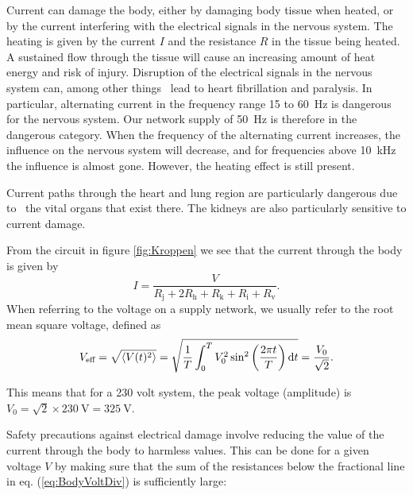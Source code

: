 \documentclass[../Elmag-labhefte-2022.tex]{subfiles}
\begin{document}
Current can damage the body, either by damaging body tissue when heated, or by the current interfering with the electrical signals in the nervous system. The heating is given by the current $I$ and the resistance $R$ in the tissue being heated. A sustained flow through the tissue will cause an increasing amount of heat energy and risk of injury. Disruption of the electrical signals in the nervous system can, among other things \, lead to heart fibrillation and paralysis. In particular, alternating current in the frequency range \num{15} to \SI{60}{\hertz} is dangerous for the nervous system. Our network supply of \SI{50}{\hertz} is therefore in the dangerous category. When the frequency of the alternating current increases, the influence on the nervous system will decrease, and for frequencies above \SI{10}{\kilo\hertz} the influence is almost gone. However, the heating effect is still present.

Current paths through the heart and lung region are particularly dangerous due to \ the vital organs that exist there. The kidneys are also particularly sensitive to current damage.

From the circuit in figure \ref{fig:Kroppen} we see that the current through the body is given by
\begin{equation}
  I = \frac{V}{R_\text{j} + 2R_\text{h} + R_\text{k} + R_\text{i} + R_\text{v}}.
  \label{eq:BodyVoltDiv}
\end{equation}
When referring to the voltage on a supply network, we usually refer to the root mean square voltage, defined as
\begin{equation}
    V_\text{eff}
        = \sqrt{\langle V(t)^2 \rangle}
        = \sqrt{\frac{1}{T} \int_0^T V_0^2 \sin^2 \qty(\frac{2\pi t}{T}) \dd{t}}
        = \frac{V_0}{\sqrt{2}}.
    \label{eq:EffectiveV}
\end{equation}

This means that for a \num{230} volt system, the peak voltage (amplitude) is $V_0 = \sqrt{2} \times \SI{230}{\V} = \SI{325}{\V}$.

Safety precautions against electrical damage involve reducing the value of the current through the body to harmless values. This can be done for a given voltage $V$ by making sure that the sum of the resistances below the fractional line in eq. (\ref{eq:BodyVoltDiv}) is sufficiently large:
\end{document}
